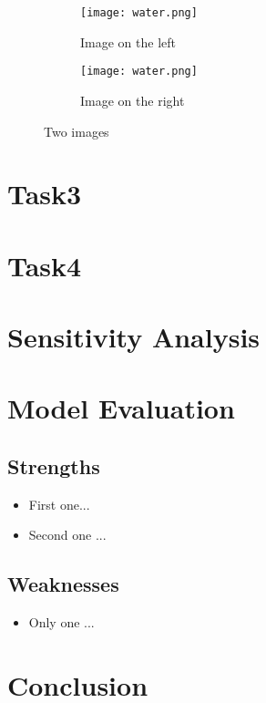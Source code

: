 \documentclass[12pt]{article}  %
\begin{document}
\begin{figure}[htbp]
\centering
\begin{subfigure}[b]{.4\textwidth}
\texttt{[image: water.png]}
\caption{Image on the left}\label{subfig:left}
\end{subfigure}
\begin{subfigure}[b]{.4\textwidth}
\texttt{[image: water.png]}
\caption{Image on the right}\label{subfig:right}
\end{subfigure}
\caption{Two images}\label{fig:subfigures}
\end{figure}

\section{Task3}

\section{Task4}

\section{Sensitivity Analysis}

\section{Model Evaluation}
\subsection{Strengths}
\begin{itemize}
    \item First one...
    \item Second one ...
\end{itemize}

\subsection{Weaknesses}
\begin{itemize}
    \item Only one ...
 \end{itemize}
 
\section{Conclusion}
\end{document}
